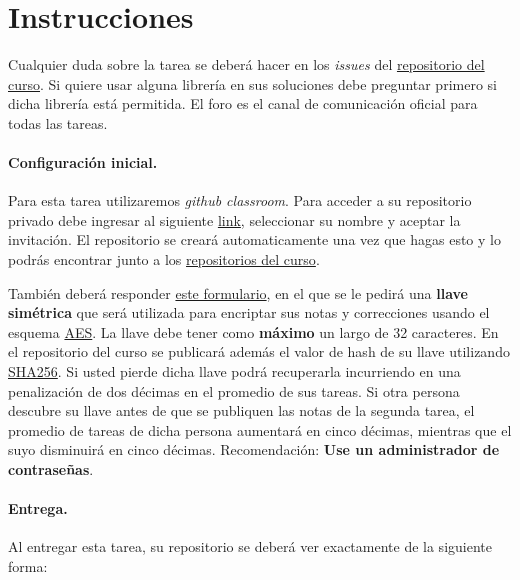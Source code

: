 
\section*{Instrucciones}

Cualquier duda sobre la tarea se deberá hacer en los \emph{issues} del \href{https://github.com/IIC3253/2023}{repositorio del curso}. Si quiere usar alguna librería en sus soluciones debe preguntar primero si dicha librería está permitida. El foro es el canal de comunicación oficial para todas las tareas.

\paragraph{Configuración inicial.} 
Para esta tarea utilizaremos \textit{github classroom}. 
Para acceder a su repositorio privado debe ingresar al siguiente \href{https://classroom.github.com/a/4ie2AjuF}{link}, seleccionar su nombre y aceptar la invitación.
El repositorio se creará automaticamente una vez que hagas esto y lo podrás encontrar junto a los \href{https://github.com/orgs/IIC3253/repositories}{repositorios del curso}.

\bigskip

También deberá responder \href{https://forms.gle/1KRanAJxcusURsUx8}{este formulario}, en el que se le pedirá una \textbf{llave simétrica} que será utilizada para encriptar sus notas y correcciones usando el esquema \href{https://en.wikipedia.org/wiki/Advanced_Encryption_Standard}{AES}.
La llave debe tener como \textbf{máximo} un largo de 32 caracteres.
En el repositorio del curso se publicará además el valor de hash de su llave utilizando \href{https://en.wikipedia.org/wiki/SHA-2}{SHA256}. 
Si usted pierde dicha llave podrá recuperarla incurriendo en una penalización de dos décimas en el promedio de sus tareas. 
Si otra persona descubre su llave antes de que se publiquen las notas de la segunda tarea, el promedio de tareas de dicha persona aumentará en cinco décimas, mientras que el suyo disminuirá en cinco décimas. 
Recomendación: \textbf{Use un administrador de contraseñas}.


\paragraph{Entrega.} Al entregar esta tarea, su repositorio se deberá ver exactamente de la siguiente forma:

\bigskip

